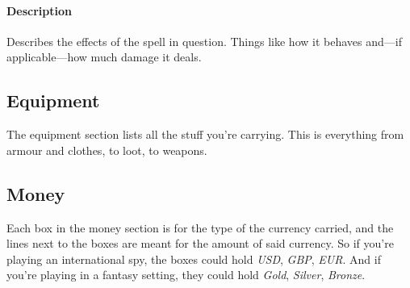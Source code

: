 \paragraph{Description} Describes the effects of the spell in question.
Things like how it behaves and---if applicable---how much damage it deals.

\subsection{Equipment}
The equipment section lists all the stuff you're carrying.
This is everything from armour and clothes, to loot, to weapons.

\subsection{Money}
Each box in the money section is for the type of the currency carried, and the lines next to the boxes are meant for the amount of said currency.
So if you're playing an international spy, the boxes could hold \textit{USD}, \textit{GBP}, \textit{EUR}.
And if you're playing in a fantasy setting, they could hold \textit{Gold}, \textit{Silver}, \textit{Bronze}.